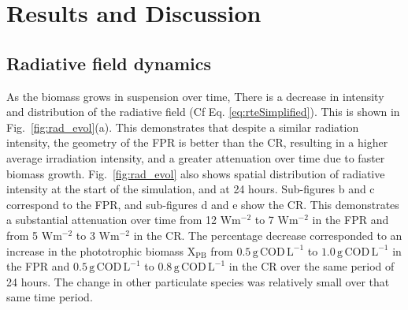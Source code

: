 
\section{Results and Discussion}

\subsection{Radiative field dynamics}

As the biomass grows in suspension over time, There is a decrease in intensity and distribution of the radiative field (Cf Eq. \ref{eq:rteSimplified}). This is shown in Fig.\ \ref{fig:rad_evol}(a). This demonstrates that despite a similar radiation intensity, the geometry of the FPR is better than the CR, resulting in a higher average irradiation intensity, and a greater attenuation over time due to faster biomass growth. Fig.\ \ref{fig:rad_evol} also shows spatial distribution of radiative intensity at the start of the simulation, and at 24 hours. Sub-figures b and c correspond to the FPR, and sub-figures d and e show the CR. This demonstrates a substantial attenuation over time from 12 $\mathrm{W m^{-2}}$ to 7 $\mathrm{W m^{-2}}$ in the FPR and from 5 $\mathrm{W m^{-2}}$ to 3 $\mathrm{W m^{-2}}$ in the CR. The percentage decrease corresponded to an increase in the phototrophic biomass $\mathrm{X_{PB}}$ from $\mathrm{0.5 \, g\, COD\, L^{-1}}$ to $\mathrm{1.0 \, g\, COD\, L^{-1}}$ in the FPR and $\mathrm{0.5 \, g\, COD\, L^{-1}}$ to $\mathrm{0.8 \, g\, COD\, L^{-1}}$ in the CR over the same period of 24 hours. The change in other particulate species was relatively small over that same time period. 

